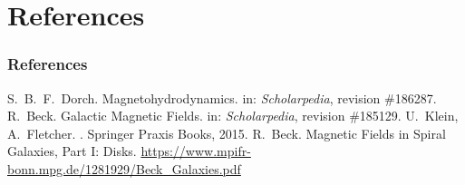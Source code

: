 \documentclass[mathserif]{beamer}
\begin{document}
\appendix
{}
\setcounter{finalframe}{\value{framenumber}}


\section{References}
\begin{frame}
    \frametitle<presentation>{References}

    \begin{thebibliography}{10}
    \beamertemplatearticlebibitems
        S.~B.~F.~Dorch.
        \newblock Magnetohydrodynamics.
        \newblock in: {\em Scholarpedia}, revision \#186287.
    \beamertemplatearticlebibitems
        R.~Beck.
        \newblock Galactic Magnetic Fields.
        \newblock in: {\em Scholarpedia}, revision \#185129.
    \beamertemplatebookbibitems
        U.~Klein, A.~Fletcher.
        .
        \newblock Springer Praxis Books, 2015.
    \beamertemplateonlinebibitems
        R.~Beck.
        \newblock Magnetic Fields in Spiral Galaxies, Part I: Disks.
        \newblock \url{https://www.mpifr-bonn.mpg.de/1281929/Beck_Galaxies.pdf}
    \end{thebibliography}

\end{frame}


\setcounter{framenumber}{\value{finalframe}}
\end{document}
